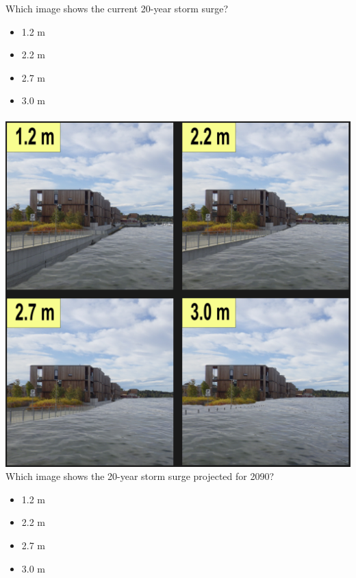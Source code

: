 Which image shows the current 20-year storm surge?
\begin{itemize}
    \item 1.2 m
    \item 2.2 m
    \item 2.7 m
    \item 3.0 m
\end{itemize}
\paragraph{}

\includegraphics[width=1\textwidth]{fig_appendix/grillstad 2090 q.png}
Which image shows the 20-year storm surge projected for 2090?
\begin{itemize}
    \item 1.2 m
    \item 2.2 m
    \item 2.7 m
    \item 3.0 m
\end{itemize}
\paragraph{}

